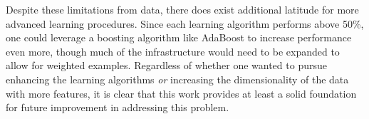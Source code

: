 \documentclass[10pt,letterpaper]{article}
\begin{document}
Despite these limitations from data, there does exist additional latitude for more advanced learning procedures.
Since each learning algorithm performs above 50\%, one could leverage a boosting algorithm like AdaBoost to increase performance even more, though much of the infrastructure would need to be expanded to allow for weighted examples.
Regardless of whether one wanted to pursue enhancing the learning algorithms \emph{or} increasing the dimensionality of the data with more features, it is clear that this work provides at least a solid foundation for future improvement in addressing this problem.


%
%
\end{document}
